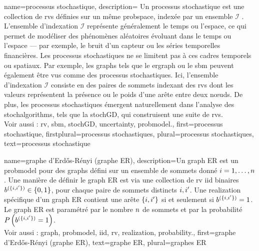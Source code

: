 {name={processus stochastique},
	description={
		Un processus stochastique est une collection de 
		\glspl{rv} définies sur un même \gls{probspace}, indexée par un ensemble 
		$\mathcal{I}$ \cite{papoulis,GrayProbBook,Brockwell91}. L’ensemble d’indexation 
		$\mathcal{I}$ représente généralement le temps ou l’espace, ce qui permet de modéliser 
		des phénomènes aléatoires évoluant dans le temps ou l’espace — par exemple, 
		le bruit d'un capteur ou les séries temporelles financières. Les processus stochastiques ne 
		se limitent pas à ces cadres temporels ou spatiaux. Par exemple, les \glspl{graph} tels que 
		le \gls{ergraph} ou le \gls{sbm} 
		peuvent également être vus comme des processus stochastiques. Ici, l’ensemble d’indexation $\mathcal{I}$ 
		consiste en des paires de sommets indexant des \glspl{rv} dont les valeurs représentent 
		la présence ou le poids d’une arête entre deux nœuds. De plus, les processus stochastiques 
		émergent naturellement dans l’analyse des \glspl{stochalgorithm}, 
		tels que la \gls{stochGD}, qui construisent une suite de \glspl{rv}. 
		\\
		Voir aussi : \gls{rv}, \gls{sbm}, \gls{stochGD}, \gls{uncertainty}, \gls{probmodel}.},
	first={processus stochastique},
	firstplural={processus stochastiques},
	plural={processus stochastiques},
	text={processus stochastique}
}

{name={graphe d'Erd\H{o}s-R\'enyi (graphe ER)},
	description={Un \gls{graph} ER est un \gls{probmodel} pour des \glspl{graph} défini sur un ensemble de sommets donné $i=1, \ldots, n$. Une manière de définir le \gls{graph} ER est via une collection de \gls{rv} \gls{iid} binaires $b^{(\{i,i'\})} \in \{0,1\}$, pour chaque paire de sommets distincts $i, i'$. Une \gls{realization} spécifique d’un \gls{graph} ER contient une arête $\{i,i'\}$ si et seulement si $b^{(\{i,i'\})}=1$. Le \gls{graph} ER est paramétré par le nombre $n$ de sommets et par la probabilité $P\left(b^{(\{i,i'\})}=1\right)$. 
		\\
		Voir aussi : \gls{graph}, \gls{probmodel}, \gls{iid}, \gls{rv}, \gls{realization}, \gls{probability}.},
	first={graphe d'Erd\H{o}s-R\'enyi (graphe ER)},
	text={graphe ER}, plural={graphes ER}
}

